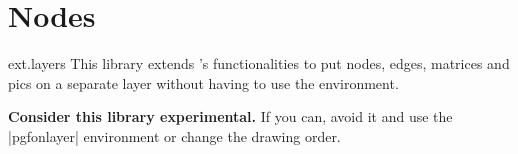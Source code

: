 %
%
%

\section{Nodes}
\begin{tikzlibrary}{ext.layers}
This library extends \tikzname's functionalities to put nodes, edges, matrices and pics
on a separate layer without having to use the  environment.

\textbf{Consider this library experimental.}
If you can, avoid it and use the |pgfonlayer| environment
or change the drawing order.
\end{tikzlibrary}

